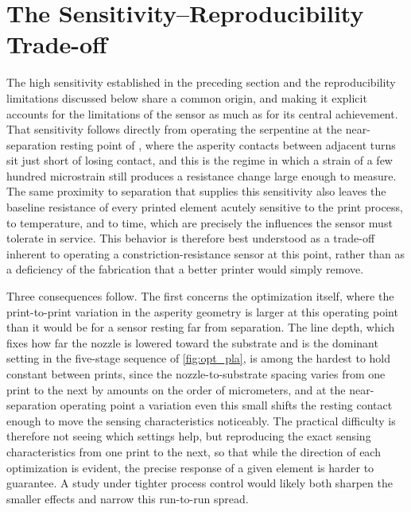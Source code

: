 \section{The Sensitivity–Reproducibility Trade-off} \label{sec:tradeoff}
The high sensitivity established in the preceding section and the reproducibility limitations discussed below share a common origin, and making it explicit accounts for the limitations of the sensor as much as for its central achievement. That sensitivity follows directly from operating the serpentine at the near-separation resting point of , where the asperity contacts between adjacent turns sit just short of losing contact, and this is the regime in which a strain of a few hundred microstrain still produces a resistance change large enough to measure. The same proximity to separation that supplies this sensitivity also leaves the baseline resistance of every printed element acutely sensitive to the print process, to temperature, and to time, which are precisely the influences the sensor must tolerate in service. This behavior is therefore best understood as a trade-off inherent to operating a constriction-resistance sensor at this point, rather than as a deficiency of the fabrication that a better printer would simply remove.

Three consequences follow. The first concerns the optimization itself, where the print-to-print variation in the asperity geometry is larger at this operating point than it would be for a sensor resting far from separation. The line depth, which fixes how far the nozzle is lowered toward the substrate and is the dominant setting in the five-stage sequence of \cref{fig:opt_pla}, is among the hardest to hold constant between prints, since the nozzle-to-substrate spacing varies from one print to the next by amounts on the order of micrometers, and at the near-separation operating point a variation even this small shifts the resting contact enough to move the sensing characteristics noticeably. The practical difficulty is therefore not seeing which settings help, but reproducing the exact sensing characteristics from one print to the next, so that while the direction of each optimization is evident, the precise response of a given element is harder to guarantee. A study under tighter process control would likely both sharpen the smaller effects and narrow this run-to-run spread.

